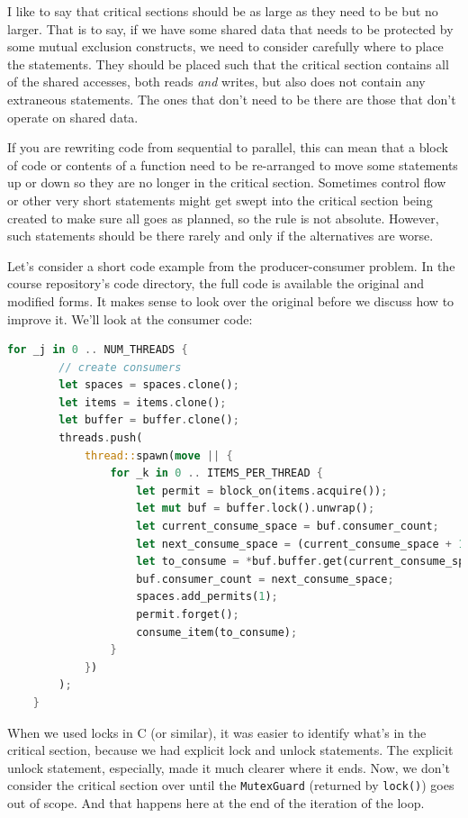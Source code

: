\documentclass[a4paper]{report}
\begin{document}
I like to say that critical sections should be as large as they need to be but no larger. That is to say, if we have some shared data that needs to be protected by some mutual exclusion constructs, we need to consider carefully where to place the statements. They should be placed such that the critical section contains all of the shared accesses, both reads \textit{and} writes, but also does not contain any extraneous statements. The ones that don't need to be there are those that don't operate on shared data.

If you are rewriting code from sequential to parallel, this can mean that a block of code or contents of a function need to be re-arranged to move some statements up or down so they are no longer in the critical section. Sometimes control flow or other very short statements might get swept into the critical section being created to make sure all goes as planned, so the rule is not absolute. However, such statements should be there rarely and only if the alternatives are worse.

Let's consider a short code example from the producer-consumer problem. In the course repository's code directory, the full code is available the original and modified forms. It makes sense to look over the original before we discuss how to improve it. We'll look at the consumer code:

\begin{lstlisting}[language=Rust]
    for _j in 0 .. NUM_THREADS {
        // create consumers
        let spaces = spaces.clone();
        let items = items.clone();
        let buffer = buffer.clone();
        threads.push(
            thread::spawn(move || {
                for _k in 0 .. ITEMS_PER_THREAD {
                    let permit = block_on(items.acquire());
                    let mut buf = buffer.lock().unwrap();
                    let current_consume_space = buf.consumer_count;
                    let next_consume_space = (current_consume_space + 1) % buf.buffer.len();
                    let to_consume = *buf.buffer.get(current_consume_space).unwrap();
                    buf.consumer_count = next_consume_space;
                    spaces.add_permits(1);
                    permit.forget();
                    consume_item(to_consume);
                }
            })
        );
    }

\end{lstlisting}

When we used locks in C (or similar), it was easier to identify what's in the critical section, because we had explicit lock and unlock statements. The explicit unlock statement, especially, made it much clearer where it ends. Now, we don't consider the critical section over until the \texttt{MutexGuard} (returned by \texttt{lock()}) goes out of scope. And that happens here at the end of the iteration of the loop.
\end{document}
